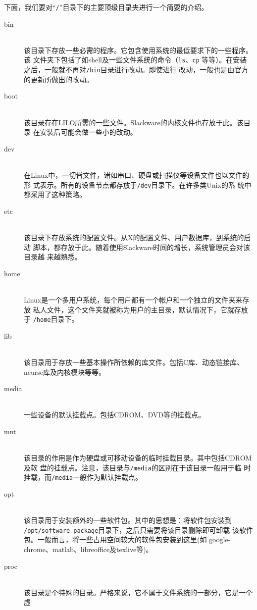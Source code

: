 下面，我们要对``\texttt{/}''目录下的主要顶级目录夹进行一个简要的介绍。
\begin{description}
\item[bin] \hfill \\
  该目录下存放一些必需的程序。它包含使用系统的最低要求下的一些程序。该
  文件夹下包括了如shell及一些文件系统的命令（\texttt{ls}、\texttt{cp}
  等等）。在安装之后，一般就不再对\texttt{/bin}目录进行改动。即使进行
  改动，一般也是由官方的更新所做出的改动。
\item[boot] \hfill \\
  该目录存在LILO所需的一些文件。Slackware的内核文件也存放于此。该目录
  在安装后可能会做一些小的改动。
\item[dev] \hfill \\
  在Linux中，一切皆文件，诸如串口、硬盘或扫描仪等设备文件也以文件的形
  式表示。所有的设备节点都存放于\texttt{/dev}目录下。在许多类Unix的系
  统中都采用了这种策略。
\item[etc] \hfill \\
  该目录下存放系统的配置文件。从X的配置文件、用户数据库，到系统的启动
  脚本，都存放于此。随着使用Slackware时间的增长，系统管理员会对该目录越
  来越熟悉。
\item[home] \hfill \\
  Linux是一个多用户系统，每个用户都有一个帐户和一个独立的文件夹来存放
  私人文件，这个文件夹就被称为用户的主目录，默认情况下，它就存放于
  \texttt{/home}目录下。
\item[lib] \hfill \\
  该目录用于存放一些基本操作所依赖的库文件。包括C库、动态链接库、
  ncurse库及内核模块等等。
\item[media] \hfill \\
  一些设备的默认挂载点。包括CDROM、DVD等的挂载点。
\item[mnt] \hfill \\
  该目录的作用是作为硬盘或可移动设备的临时挂载目录。其中包括CDROM及软
  盘的挂载点。注意，该目录与\texttt{/media}的区别在于该目录一般用于临
  时挂载，而\texttt{/media}一般作为默认挂载点。
\item[opt] \hfill \\
  该目录用于安装额外的一些软件包。其中的思想是：将软件包安装到
  \texttt{/opt/software-package}目录下，之后只需要将该目录删除即可卸载
  该软件包。一般而言，将一些占用空间较大的软件包安装到这里(如
  google-chrome、matlab、libreoffice及texlive等)。
\item[proc] \hfill \\
  该目录是个特殊的目录。严格来说，它不属于文件系统的一部分，它是一个虚

\end{description}
